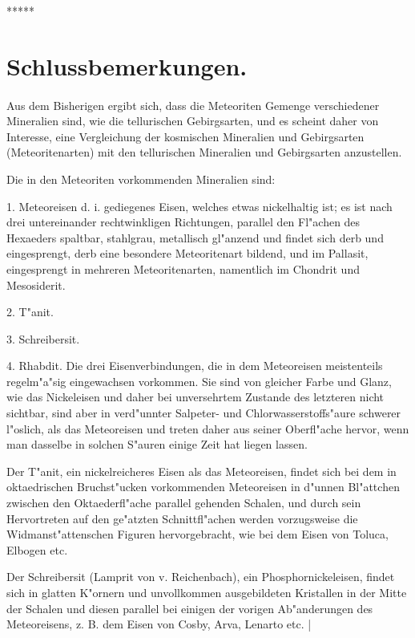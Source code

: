 \documentclass[a4paper, 11pt, oneside]{article}
\begin{document}
\centerline{*\hspace{15mm}*\hspace{15mm}*\hspace{15mm}*\hspace{15mm}*}
\clearpage
\section{Schlussbemerkungen.}
\paragraph{}
Aus dem Bisherigen ergibt sich, dass die Meteoriten Gemenge verschiedener Mineralien sind, wie die tellurischen Gebirgsarten, und es scheint daher von Interesse, eine Vergleichung der kosmischen Mineralien und Gebirgsarten (Meteoritenarten) mit den tellurischen Mineralien und Gebirgsarten anzustellen.

Die in den Meteoriten vorkommenden Mineralien sind:

1. Meteoreisen d. i. gediegenes Eisen, welches etwas nickelhaltig ist; es ist nach drei untereinander rechtwinkligen Richtungen, parallel den Fl"achen des Hexaeders spaltbar, stahlgrau, metallisch gl"anzend und findet sich derb und eingesprengt, derb eine besondere Meteoritenart bildend, und im Pallasit, eingesprengt in mehreren Meteoritenarten, namentlich im Chondrit und Mesosiderit.

2. T"anit.

3. Schreibersit.

4. Rhabdit. Die drei Eisenverbindungen, die in dem Meteoreisen meistenteils regelm"a"sig eingewachsen vorkommen. Sie sind von gleicher Farbe und Glanz, wie das Nickeleisen und daher bei unversehrtem Zustande des letzteren nicht sichtbar, sind aber in verd"unnter Salpeter- und Chlorwasserstoffs"aure schwerer l"oslich, als das Meteoreisen und treten daher aus seiner Oberfl"ache hervor, wenn man dasselbe in solchen S"auren einige Zeit hat liegen lassen.

Der T"anit, ein nickelreicheres Eisen als das Meteoreisen, findet sich bei dem in oktaedrischen Bruchst"ucken vorkommenden Meteoreisen in d"unnen Bl"attchen zwischen den Oktaederfl"ache parallel gehenden Schalen, und durch sein Hervortreten auf den ge"atzten Schnittfl"achen werden vorzugsweise die Widmanst"attenschen Figuren hervorgebracht, wie bei dem Eisen von Toluca, Elbogen etc.

Der Schreibersit (Lamprit von v. Reichenbach), ein Phosphornickeleisen, findet sich in glatten K"ornern und unvollkommen ausgebildeten Kristallen in der Mitte der Schalen und diesen parallel bei einigen der vorigen Ab"anderungen des Meteoreisens, z. B. dem Eisen von Cosby, Arva, Lenarto etc. |
\end{document}
